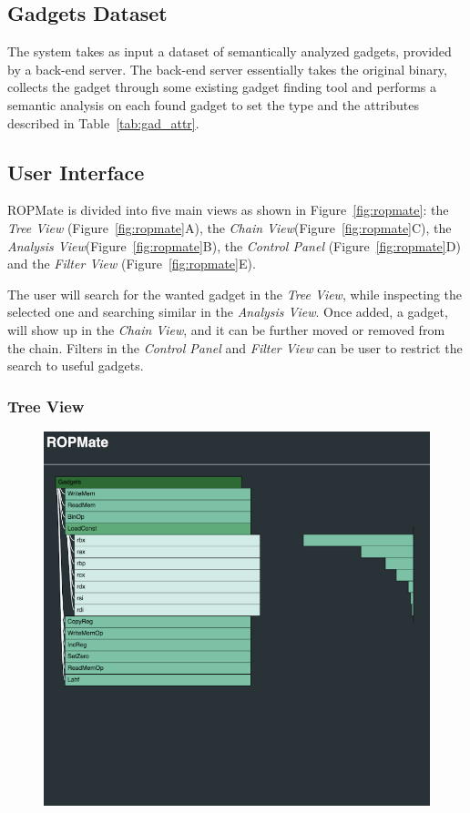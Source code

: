 \documentclass[twocolumn, 11pt]{article}
\begin{document}
\subsection{Gadgets Dataset} The system takes as input a dataset of semantically analyzed gadgets, provided by a back-end server. The back-end server essentially takes the original binary, collects the gadget through some existing gadget finding tool and performs a semantic analysis on each found gadget to set the type and the attributes described in Table~\ref{tab:gad_attr}.

\subsection{User Interface}
ROPMate is divided into five main views as shown in Figure~\ref{fig:ropmate}: the \textit{Tree View} (Figure~\ref{fig:ropmate}A), the \textit{Chain View}(Figure~\ref{fig:ropmate}C), the \textit{Analysis View}(Figure~\ref{fig:ropmate}B), the \textit{Control Panel} (Figure~\ref{fig:ropmate}D) and the \textit{Filter View} (Figure~\ref{fig:ropmate}E).

The user will search for the wanted gadget in the \textit{Tree View}, while inspecting the selected one and searching similar in the \textit{Analysis View}. Once added, a gadget, will show up in the \textit{Chain View}, and it can be further moved or removed from the chain. Filters in the \textit{Control Panel} and \textit{Filter View} can be user to restrict the search to useful gadgets.

\subsubsection{Tree View}
\begin{figure}[htb]
  \centering
  \includegraphics[width=0.6\linewidth]{tree-view}
\end{figure}
\end{document}
